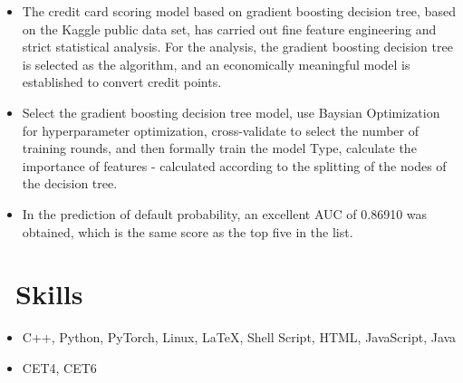 \documentclass{resume}
\begin{document}
\begin{itemize}
  \item The credit card scoring model based on gradient boosting decision tree, based on the Kaggle public data set, has carried out fine feature engineering and strict statistical analysis.
  For the analysis, the gradient boosting decision tree is selected as the algorithm, and an economically meaningful model is established to convert credit points.
  \item Select the gradient boosting decision tree model, use Baysian Optimization for hyperparameter optimization, cross-validate to select the number of training rounds, and then formally train the model
  Type, calculate the importance of features - calculated according to the splitting of the nodes of the decision tree.
  \item In the prediction of default probability, an excellent AUC of 0.86910 was obtained, which is the same score as the top five in the list.
\end{itemize}

\section{\faCogs\ Skills}
\begin{itemize}[parsep=0.5ex]
  \item C++, Python, PyTorch, Linux, LaTeX, Shell Script, HTML, JavaScript, Java
  \item CET4, CET6
\end{itemize}
%
%
\end{document}
